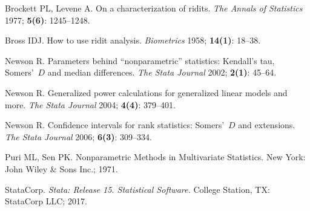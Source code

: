 \documentclass[a4paper]{article}      %
\begin{document}
{\parindent=0pt

\smallskip

\begin{thebibliography}{10}

Brockett PL, Levene A.
On a characterization of ridits.
\textsl{The Annals of Statistics} 1977; \textbf{5(6)}: 1245--1248.

Bross IDJ.
How to use ridit analysis.
\textsl{Biometrics} 1958; \textbf{14(1)}: 18--38.

Newson R. Parameters behind ``nonparametric'' statistics: Kendall's tau, Somers'~$D$ and median differences.
\textsl{The Stata Journal} 2002; \textbf{2(1)}: 45--64.

Newson R. Generalized power calculations for generalized linear models and more.
\textsl{The Stata Journal} 2004; \textbf{4(4)}: 379--401.

Newson R. Confidence intervals for rank statistics: Somers'~$D$ and extensions.
\textsl{The Stata Journal} 2006; \textbf{6(3)}: 309--334.

Puri ML, Sen PK.
Nonparametric Methods in Multivariate Statistics.
New York: John Wiley \& Sons Inc.; 1971.

StataCorp.
\textsl{Stata: Release 15. Statistical Software.}
College Station, TX: StataCorp LLC; 2017.

\end{thebibliography}

}
\end{document}
